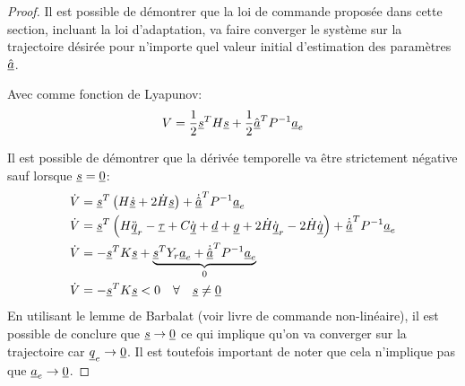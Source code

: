 

\begin{proof}
Il est possible de démontrer que la loi de commande proposée dans cette section, incluant la loi d'adaptation, va faire converger le système sur la trajectoire désirée pour n'importe quel valeur initial d'estimation des paramètres $\underline{\hat{a}}$. 

Avec comme fonction de Lyapunov:
\begin{align}
V = \frac{1}{2} \underline{s}^T H \underline{s} + \frac{1}{2} \underline{\hat{a}}^T P^{-1} \underline{a}_e
\end{align}

Il est possible de démontrer que la dérivée temporelle va être strictement négative sauf lorsque $\underline{s} = \underline{0}$:
\begin{align}
\dot{V} &= \underline{s}^T \left( H \underline{\dot{s}} + 2 \dot{H} \underline{s}  \right) + \underline{\dot{\hat{a}}}^T P^{-1} \underline{a}_e \\
\dot{V} &= \underline{s}^T \left( H \ddot{\underline{q}}_r - \underline{\tau} + C \dot{\underline{q}} +  \underline{d} + \underline{g} + 2 \dot{H} \dot{\underline{q}}_r - 2 \dot{H} \dot{\underline{q}} \right) + \underline{\dot{\hat{a}}}^T P^{-1} \underline{a}_e  \\
\dot{V} &= - \underline{s}^T K \underline{s} + 
\underbrace{
\underline{s}^T Y_r \underline{a}_e + \underline{\dot{\hat{a}}}^T P^{-1} \underline{a}_e 
}_{0} \\
\dot{V} &= - \underline{s}^T K \underline{s} < 0 \quad \forall \quad \underline{s} \neq \underline{0}
\end{align} 
En utilisant le lemme de Barbalat (voir livre de commande non-linéaire), il est possible de conclure que $\underline{s} \rightarrow \underline{0}$ ce qui implique qu'on va converger sur la trajectoire car $\underline{q}_e \rightarrow \underline{0}$. Il est toutefois important de noter que cela n'implique pas que $\underline{a}_e \rightarrow \underline{0}$.
\end{proof}


